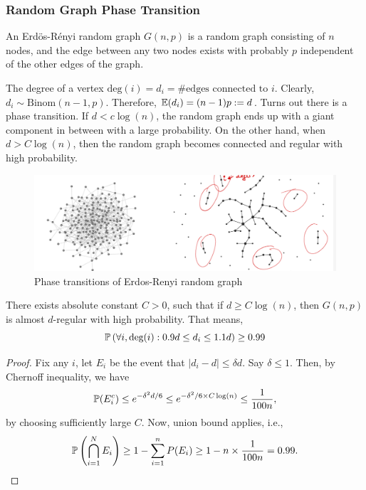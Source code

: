 \documentclass[12pt]{article}
\begin{document}
\subsubsection{Random Graph Phase Transition}

\begin{definitionbox}
    An Erd\"{o}s-R\'{e}nyi random graph $G(n, p)$ is a random graph consisting of $n$ nodes, and the edge between any two nodes exists with probably $p$ independent of the other edges of the graph.
\end{definitionbox}

The degree of a vertex $\text{deg}(i) = d_i = \# \text{edges connected to } i$. Clearly, $d_i \sim \text{Binom}(n-1, p)$. Therefore, $\mathbb{E}(d_i) = (n-1)p := d$. Turns out there is a phase transition. If $d < c\log(n)$, the random graph ends up with a giant component in between with a large probability. On the other hand, when $d > C\log(n)$, then the random graph becomes connected and regular with high probability.

\begin{figure}[h]
    \centering
    \includegraphics[width=\linewidth]{random-graph-phase-transition.png}
    \caption{Phase transitions of Erdos-Renyi random graph}
    \label{fig:random-graph-phase-transition}
\end{figure}

\begin{theorembox}
    There exists absolute constant $C > 0$, such that if $d \geq C\log(n)$, then $G(n,p)$ is almost $d$-regular with high probability. That means,
    \begin{equation*}
        \mathbb{P}\left( \forall i, \text{deg}(i) : 0.9 d \leq d_i \leq 1.1 d \right) \geq 0.99
    \end{equation*}
\end{theorembox}
\begin{proof}
    Fix any $i$, let $E_i$ be the event that $\left|d_i - d\right| \leq \delta d$. Say $\delta \leq 1$. Then, by Chernoff inequality, we have
    \begin{equation*}
        \mathbb{P}(E_i^c) \leq e^{-\delta^2 d/6} \leq e^{-\delta^2/6 \times C\log(n)} \leq \dfrac{1}{100n} ,
    \end{equation*}
    \noindent by choosing sufficiently large $C$. Now, union bound applies, i.e.,
    \begin{equation*}
        \mathbb{P}\left( \bigcap_{i=1}^{N} E_i \right) \geq 1 - \sum_{i=1}^{n} P(E_i) \geq 1 - n\times \dfrac{1}{100n} = 0.99.
    \end{equation*}
\end{proof}
\end{document}
